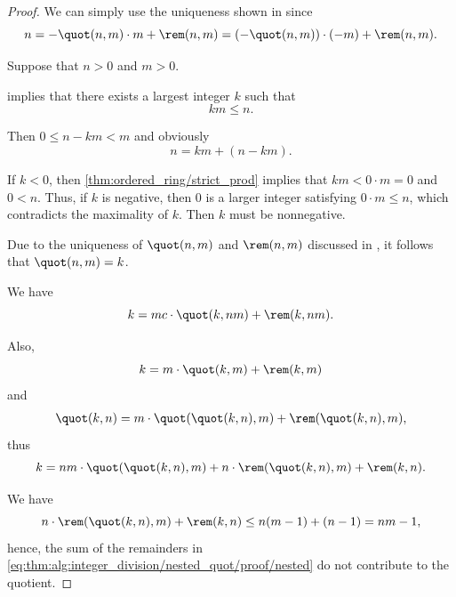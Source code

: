 \begin{proof}
   We can simply use the uniqueness shown in  since
  \begin{equation*}
    n = -\quot(n, m) \cdot m + \rem(n, m) = (-\quot(n, m)) \cdot (-m) + \rem(n, m).
  \end{equation*}

   Suppose that \( n > 0 \) and \( m > 0 \).

   implies that there exists a largest integer \( k \) such that
  \begin{equation*}
    km \leq n.
  \end{equation*}

  Then \( 0 \leq n - km < m \) and obviously
  \begin{equation*}
    n = km + (n - km).
  \end{equation*}

  If \( k < 0 \), then \cref{thm:ordered_ring/strict_prod} implies that \( km < 0 \cdot m = 0 \) and \( 0 < n \). Thus, if \( k \) is negative, then \( 0 \) is a larger integer satisfying \( 0 \cdot m \leq n \), which contradicts the maximality of \( k \). Then \( k \) must be nonnegative.

  Due to the uniqueness of \( \quot(n, m) \) and \( \rem(n, m) \) discussed in , it follows that \( \quot(n, m) = k \).

   We have
  \begin{equation}\label{eq:thm:alg:integer_division/nested_quot/proof/simple}
    k = mc \cdot \quot(k, nm) + \rem(k, nm).
  \end{equation}

  Also,
  \begin{equation*}
    k = m \cdot \quot(k, m) + \rem(k, m)
  \end{equation*}
  and
  \begin{align*}
    \quot(k, n) = m \cdot \quot(\quot(k, n), m) + \rem(\quot(k, n), m),
  \end{align*}
  thus
  \begin{equation}\label{eq:thm:alg:integer_division/nested_quot/proof/nested}
    k = nm \cdot \quot(\quot(k, n), m) + n \cdot \rem(\quot(k, n), m) + \rem(k, n).
  \end{equation}

  We have
  \begin{equation*}
    n \cdot \rem(\quot(k, n), m) + \rem(k, n)
    \leq
    n(m - 1) + (n - 1)
    =
    nm - 1,
  \end{equation*}
  hence, the sum of the remainders in \eqref{eq:thm:alg:integer_division/nested_quot/proof/nested} do not contribute to the quotient.


\end{proof}
